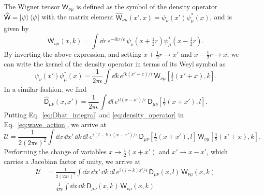 The Wigner tensor $\mathsf{W}_{\nu\mu}$ is defined as the symbol of the density operator $\widehat{\mathsf{W}} = \mathinner{\lvert{\psi}\rangle}\mathinner{\langle{\psi}\rvert}$ with the matrix element $\widehat{\mathsf{W}}_{\nu\mu}(x',x) = \psi_{\nu}(x')\psi_{\mu}^{*}(x)$, and is given by
%
\begin{equation}
  \mathsf{W}_{\nu\mu}(x, k) = \int \dd{r}\, e^{-ikr/\epsilon}\, \psi_{\nu}\left(x + \tfrac{1}{2}r\right)\psi^{*}_{\mu}\left(x - \tfrac{1}{2}r\right).
\end{equation}
%
By inverting the above expression, and setting $x + \tfrac{1}{2}r \to x'$ and $x- \tfrac{1}{2}r \to x$, we can write the kernel of the density operator in terms of its Weyl symbol as
%
\begin{equation}
  \psi_{\nu}(x') \psi^{*}_{\mu}(x) = \frac{1}{2\pi \epsilon} \int \dd{k}\, e^{ik(x' -x)/\epsilon}\,\mathsf{W}_{\nu\mu}\left[\tfrac{1}{2}(x' + x), k\right].
  \label{eq:density_operator}
\end{equation}
%
In a similar fashion, we find
%
\begin{equation}
  \widehat{\mathsf{D}}_{\mu\nu}(x, x') = \frac{1}{2\pi\epsilon} \int \dd{l}\, e^{il(x -x')/\epsilon}\,\mathsf{D}_{\mu\nu}\left[\tfrac{1}{2}(x + x'), l\right].
  \label{eq:Dhat_integral}
\end{equation}
%
Putting Eq.~\eqref{eq:Dhat_integral} and \eqref{eq:density_operator} in Eq.~\eqref{eq:wave_action}, we arrive at
%
\begin{equation}
  \mathscr{U} = \frac{1}{2(2\pi\epsilon)^{2}}\int \dd{x}\,\dd{x'}\,\dd{k}\,\dd{l}\, e^{i(l-k)(x -x')/\epsilon}\,\mathsf{D}_{\mu\nu}\left[\tfrac{1}{2}(x + x'), l\right]\, \mathsf{W}_{\nu\mu}\left[\tfrac{1}{2}(x' + x), k\right].
\end{equation}
%
Performing the change of variables $x \to \tfrac{1}{2}(x + x')$ and $x' \to x - x'$, which carries a Jacobian factor of unity, we arrive at
%
\begin{equation}
  \begin{aligned}
    \mathscr{U} &= \frac{1}{2(2\pi\epsilon)^{2}}\int \dd{x}\,\dd{x'}\,\dd{k}\,\dd{l}\, e^{i(l-k)x'/\epsilon}\,\mathsf{D}_{\mu\nu}(x, l)\,\mathsf{W}_{\nu\mu}(x, k)\\
                &= \frac{1}{4\pi\epsilon}\int \dd{x}\,\dd{k}\,\mathsf{D}_{\mu\nu}(x, k)\,\mathsf{W}_{\nu\mu}(x,k)\\
  \end{aligned}
  \label{eq:wave_action_symbol_form}
\end{equation}

